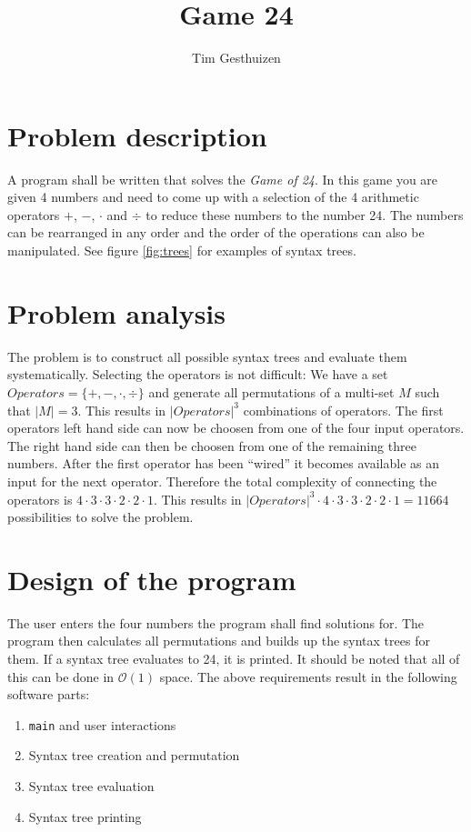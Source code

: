 \documentclass[11pt,a4paper]{article}
\author{Tim Gesthuizen}
\title{Game 24}
\begin{document}
\maketitle

\section{Problem description}

A program shall be written that solves the \textit{Game of 24}.
In this game you are given 4 numbers and need to come up with a
selection of the 4 arithmetic operators $+$, $-$, $\cdot$ and $\div$ to
reduce these numbers to the number 24.
The numbers can be rearranged in any order and the order of the
operations can also be manipulated.
See figure \ref{fig:trees} for examples of syntax trees.



\section{Problem analysis}

The problem is to construct all possible syntax trees and evaluate
them systematically.
Selecting the operators is not difficult:
We have a set $Operators = \{+, -, \cdot, \div\}$ and generate all
permutations of a multi-set $M$ such that $\vert M \vert = 3$.
\newcommand{\complexop}{{\vert Operators \vert}^3}
\newcommand{\opconnect}{4 \cdot 3 \cdot 3 \cdot 2 \cdot 2 \cdot 1}
This results in $\complexop$ combinations of
operators.
The first operators left hand side can now be choosen from one of the
four input operators.
The right hand side can then be choosen from one of the remaining
three numbers.
After the first operator has been ``wired'' it becomes available as an
input for the next operator.
Therefore the total complexity of connecting the operators is $\opconnect$.
This results in
$\complexop \cdot \opconnect = 11664$ possibilities to solve the
problem.

\section{Design of the program}

The user enters the four numbers the program shall find solutions
for. The program then calculates all permutations and builds up the
syntax trees for them. If a syntax tree evaluates to 24, it is
printed.
It should be noted that all of this can be done in $\mathcal{O}(1)$
space.
The above requirements result in the following software parts:
\begin{enumerate}
\item {\tt main} and user interactions
\item Syntax tree creation and permutation
\item Syntax tree evaluation
\item Syntax tree printing
\end{enumerate}
\end{document}
